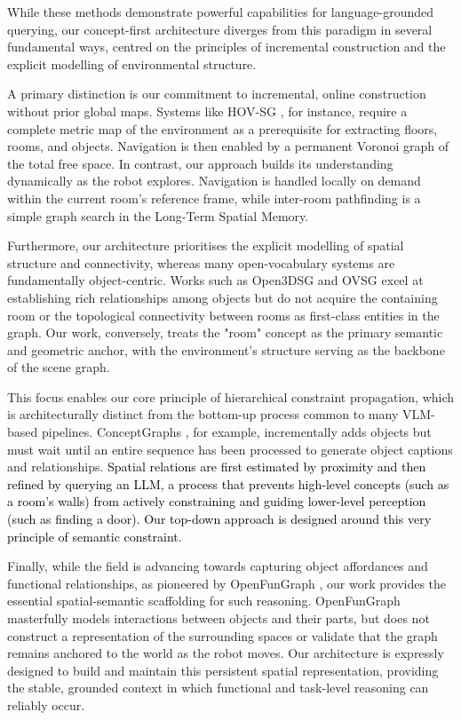 \documentclass[10pt,a4paper]{article}
\begin{document}
While these methods demonstrate powerful capabilities for language-grounded querying, our concept-first architecture diverges from this paradigm in several fundamental ways, centred on the principles of incremental construction and the explicit modelling of environmental structure.

A primary distinction is our commitment to incremental, online construction without prior global maps. Systems like HOV-SG \cite{werby24hovsg}, for instance, require a complete metric map of the environment as a prerequisite for extracting floors, rooms, and objects. Navigation is then enabled by a permanent Voronoi graph of the total free space. In contrast, our approach builds its understanding dynamically as the robot explores. Navigation is handled locally on demand within the current room's reference frame, while inter-room pathfinding is a simple graph search in the Long-Term Spatial Memory.   

Furthermore, our architecture prioritises the explicit modelling of spatial structure and connectivity, whereas many open-vocabulary systems are fundamentally object-centric. Works such as Open3DSG \cite{kochopen3dsg} and OVSG \cite{chang2023contextawareentitygroundingopenvocabulary} excel at establishing rich relationships among objects but do not acquire the containing room or the topological connectivity between rooms as first-class entities in the graph. Our work, conversely, treats the "room" concept as the primary semantic and geometric anchor, with the environment's structure serving as the backbone of the scene graph.

This focus enables our core principle of hierarchical constraint propagation, which is architecturally distinct from the bottom-up process common to many VLM-based pipelines. ConceptGraphs \cite{gu2023conceptgraphsopenvocabulary3dscene}, for example, incrementally adds objects but must wait until an entire sequence has been processed to generate object captions and relationships. \textcolor{black}{Spatial relations are first estimated by proximity and then refined by querying an LLM, a process that prevents high-level concepts (such as a room's walls) from actively constraining and guiding lower-level perception (such as finding a door). Our top-down approach is designed around this very principle of semantic constraint.}

Finally, while the field is advancing towards capturing object affordances and functional relationships, as pioneered by OpenFunGraph \cite{Zhang_2025_CVPR}, our work provides the essential spatial-semantic scaffolding for such reasoning. OpenFunGraph masterfully models interactions between objects and their parts, but does not construct a representation of the surrounding spaces or validate that the graph remains anchored to the world as the robot moves. Our architecture is expressly designed to build and maintain this persistent spatial representation, providing the stable, grounded context in which functional and task-level reasoning can reliably occur. 
\end{document}
